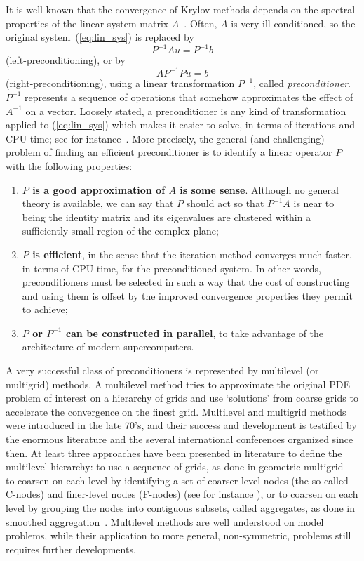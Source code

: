 \documentclass{article}[11pt]
\begin{document}
It is well known that the convergence of Krylov methods depends on 
the spectral properties of the linear system matrix
$A$~\cite{axelsson94iterative,saad96iterative,QSS}. Often, $A$ is very
ill-conditioned, so the
original system~(\ref{eq:lin_sys}) is replaced by
\[
P^{-1} A{u} = P^{-1} {b}
\]
(left-preconditioning), or by
\[
A P^{-1} P {u} = {b}
\]
(right-preconditioning), using a linear transformation $P^{-1}$,
called {\sl preconditioner}. $P^{-1}$ represents a sequence of operations
that somehow approximates the effect of $A^{-1}$ on a vector. 
Loosely stated, a preconditioner is any
kind of transformation applied to (\ref{eq:lin_sys}) which makes it
easier to solve, in terms of iterations and CPU time; see for
instance~\cite{greenbaum97iterative,golub97closer,vorst95parallel}. More precisely,
the general (and challenging) problem of finding an efficient
preconditioner is to identify a linear operator $P$ with the following
properties:
\begin{enumerate}
\item {\bf $P$ is a good approximation of $A$ is some sense}. Although no
  general theory is available, we can say that $P$ should act so that
  $P^{-1} A$ is near to being the identity matrix and its eigenvalues
  are clustered within a sufficiently small region of the complex plane;
\item {\bf $P$ is efficient}, in the sense that the iteration method converges
  much faster, in terms of CPU time, for the preconditioned system.  In
  other words, preconditioners must be selected in such a way that the
  cost of constructing and using them is offset by the improved
  convergence properties they permit to achieve;
\item {\bf $P$ or $P^{-1}$ can be constructed in parallel}, to take advantage of the architecture of modern supercomputers.
\end{enumerate}

\smallskip

A very successful class of preconditioners is represented by multilevel (or
multigrid) methods.
A multilevel method tries to approximate
the original PDE problem of interest on a hierarchy of grids and use
`solutions' from coarse grids to accelerate the convergence
on the finest grid.  
Multilevel and multigrid methods were introduced in the late 70's, and their
success and development is testified by the enormous literature and the several
international conferences organized since then. 
At least three
approaches have been presented in literature to define the multilevel
hierarchy:
to use a sequence of grids, as done in geometric multigrid~\cite{brandt.classic,hack.book,hack2.book}
to coarsen on each level by identifying a set of coarser-level nodes
(the so-called C-nodes) and finer-level nodes (F-nodes) 
(see for instance \cite{Briggs,WHackbusch_1985a}), or 
to coarsen on each level by grouping the nodes into contiguous subsets,
called aggregates, as done in smoothed 
aggregation~\cite{vanek1,vanek2,vanek3}.
Multilevel methods are well understood on model problems, while their
application to more general, non-symmetric, problems still requires
further developments.
\end{document}
